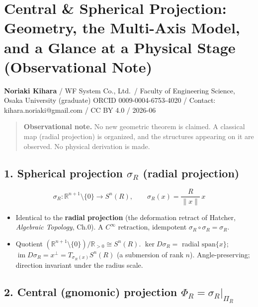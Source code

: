 \documentclass[
  10pt,
]{article}
\author{}
\date{}
\providecommand{\tightlist}{%
  \setlength{\itemsep}{0pt}\setlength{\parskip}{0pt}}
\begin{document}
\section{Central \& Spherical Projection: Geometry, the Multi-Axis
Model, and a Glance at a Physical Stage (Observational
Note)}\label{central-spherical-projection-geometry-the-multi-axis-model-and-a-glance-at-a-physical-stage-observational-note}

\textbf{Noriaki Kihara} / WF System Co., Ltd.~/ Faculty of Engineering
Science, Osaka University (graduate) ORCID 0009-0004-6753-4020 /
Contact: kihara.noriaki@gmail.com / CC BY 4.0 / 2026-06

\begin{quote}
\textbf{Observational note.} No new geometric theorem is claimed. A
classical map (radial projection) is organized, and the structures
appearing on it are observed. No physical derivation is made.
\end{quote}

\subsection{\texorpdfstring{1. Spherical projection \(\sigma_R\) (radial
projection)}{1. Spherical projection \textbackslash sigma\_R (radial projection)}}\label{spherical-projection-sigma_r-radial-projection}

\[\sigma_R:\mathbb{R}^{n+1}\setminus\{0\}\to S^n(R),\qquad \sigma_R(x)=\frac{R}{\|x\|}\,x\]

\begin{itemize}
\tightlist
\item
  Identical to the \textbf{radial projection} (the deformation retract
  of Hatcher, \emph{Algebraic Topology}, Ch.0). A \(C^\infty\)
  retraction, idempotent \(\sigma_R\circ\sigma_R=\sigma_R\).
\item
  Quotient
  \((\mathbb{R}^{n+1}\setminus\{0\})/\mathbb{R}_{>0}\cong S^n(R)\).
  \(\ker D\sigma_R=\) radial \(\mathrm{span}\{x\}\);
  \(\operatorname{im}D\sigma_R=x^{\perp}=T_{\sigma_R(x)}S^n(R)\) (a
  submersion of rank \(n\)). Angle-preserving; direction invariant under
  the radius scale.
\end{itemize}

\subsection{\texorpdfstring{2. Central (gnomonic) projection
\(\Phi_R=\sigma_R|_{\Pi_R}\)}{2. Central (gnomonic) projection \textbackslash Phi\_R=\textbackslash sigma\_R\textbar\_\{\textbackslash Pi\_R\}}}\label{central-gnomonic-projection-phi_rsigma_r_pi_r}
\end{document}
